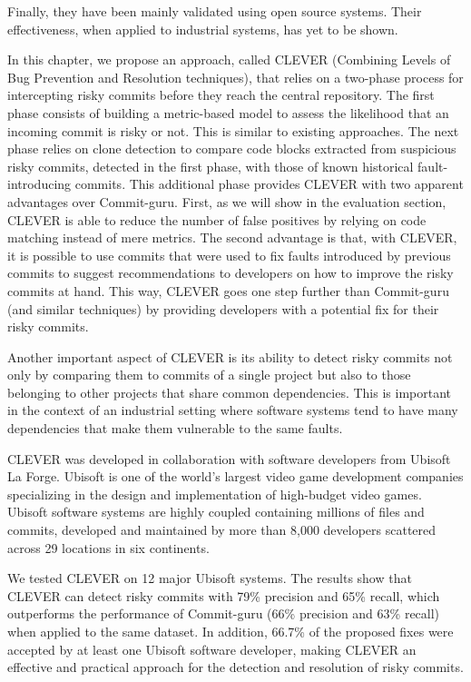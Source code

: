 \documentclass[12pt]{report}
\begin{document}
Finally, they have been mainly validated using open source systems.
Their effectiveness, when applied to industrial systems, has yet to be
shown.

In this chapter, we propose an approach, called CLEVER (Combining Levels
of Bug Prevention and Resolution techniques), that relies on a two-phase
process for intercepting risky commits before they reach the central
repository. The first phase consists of building a metric-based model to
assess the likelihood that an incoming commit is risky or not. This is
similar to existing approaches. The next phase relies on clone detection
to compare code blocks extracted from suspicious risky commits, detected
in the first phase, with those of known historical fault-introducing
commits. This additional phase provides CLEVER with two apparent
advantages over Commit-guru. First, as we will show in the evaluation
section, CLEVER is able to reduce the number of false positives by
relying on code matching instead of mere metrics. The second advantage
is that, with CLEVER, it is possible to use commits that were used to
fix faults introduced by previous commits to suggest recommendations to
developers on how to improve the risky commits at hand. This way, CLEVER
goes one step further than Commit-guru (and similar techniques) by
providing developers with a potential fix for their risky commits.

Another important aspect of CLEVER is its ability to detect risky
commits not only by comparing them to commits of a single project but
also to those belonging to other projects that share common
dependencies. This is important in the context of an industrial setting
where software systems tend to have many dependencies that make them
vulnerable to the same faults.

CLEVER was developed in collaboration with software developers from
Ubisoft La Forge. Ubisoft is one of the world's largest video game
development companies specializing in the design and implementation of
high-budget video games. Ubisoft software systems are highly coupled
containing millions of files and commits, developed and maintained by
more than 8,000 developers scattered across 29 locations in six
continents.

We tested CLEVER on 12 major Ubisoft systems. The results show that
CLEVER can detect risky commits with 79\% precision and 65\% recall,
which outperforms the performance of Commit-guru (66\% precision and
63\% recall) when applied to the same dataset. In addition, 66.7\% of
the proposed fixes were accepted by at least one Ubisoft software
developer, making CLEVER an effective and practical approach for the
detection and resolution of risky commits.
\end{document}
